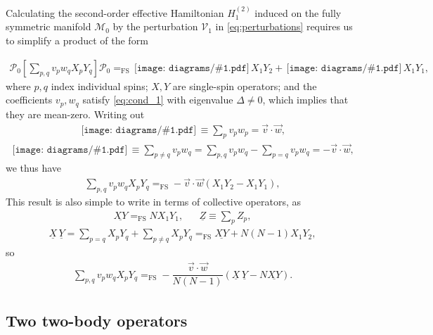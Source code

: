 \documentclass[nofootinbib,notitlepage,11pt]{revtex4-2}
\newcommand{\f}[2]{\dfrac{#1}{#2}} %
\newcommand{\p}[1]{\left(#1\right)} %
\renewcommand{\sp}[1]{\left[#1\right]} %
\renewcommand{\c}{\cdot} %
\renewcommand{\v}{\vec} %
\newcommand{\1}{\mathds{1}}
\newcommand{\M}{\mathcal{M}}
\renewcommand{\P}{\mathcal{P}}
\newcommand{\V}{\mathcal{V}}
\newcommand{\EQFS}{=_{\text{FS}}}
\newcommand{\col}{\underline}
\newcommand{\diagram}[1]
{\,\texttt{[image: diagrams/\#1.pdf]}\,}
\begin{document}
Calculating the second-order effective Hamiltonian $H_1^{(2)}$ induced
on the fully symmetric manifold $\M_0$ by the perturbation $\V_1$ in
\eqref{eq:perturbations} requires us to simplify a product of the form

\begin{align}
  \P_0 \sp{\sum_{p,q} v_p w_q X_p Y_q} \P_0
  \EQFS \diagram{single_body_0} X_1 Y_2
  + \diagram{single_body_1} X_1 Y_1,
  \label{eq:PXYP_start}
\end{align}
where $p,q$ index individual spins; $X,Y$ are single-spin operators;
and the coefficients $v_p,w_q$ satisfy \eqref{eq:cond_1} with
eigenvalue $\Delta\ne0$, which implies that they are mean-zero.
Writing out
\begin{align}
  \diagram{single_body_1}
  \equiv \sum_p v_p w_p
  = \v v\c\v w,
\end{align}
\begin{align}
  \diagram{single_body_0}
  \equiv \sum_{p\ne q} v_p w_q
  = \sum_{p,q} v_p w_q - \sum_{p=q} v_p w_q
  = - \v v \c\v w,
\end{align}
we thus have
\begin{align}
  \sum_{p,q} v_p w_q X_p Y_q
  \EQFS - \v v\c\v w \p{X_1 Y_2 - X_1 Y_1},
\end{align}
This result is also simple to write in terms of collective operators,
as
\begin{align}
  \col{X Y} \EQFS N X_1 Y_1,
  &&
  \col{Z} \equiv \sum_p Z_p,
\end{align}
\begin{align}
  \col{X}\,\col{Y}
  = \sum_{p=q} X_p Y_q + \sum_{p\ne q} X_p Y_q
  \EQFS \col{XY} + N\p{N-1} X_1 Y_2,
\end{align}
so
\begin{align}
  \sum_{p,q} v_p w_q X_p Y_q
  \EQFS - \f{\v v \c\v w}{N\p{N-1}}
  \p{\col{X}\,\col{Y} - N \col{XY}}.
\end{align}

\subsection{Two two-body operators}
\label{sec:POQP}
\end{document}
